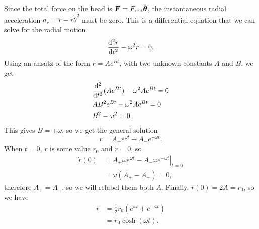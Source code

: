 \documentclass[../classical_mechanics.tex]{subfiles}
\begin{document}
\begin{example}
                Since the total force on the bead is $\boldsymbol{F}=F_\text{rod}\hat{\boldsymbol{\theta}}$, the instantaneous radial acceleration $a_r=\ddot{r}-r\dot{\theta}^2$ must be zero.
                This is a differential equation that we can solve for the radial motion.
                \begin{equation}
                    \dv[2]{r}{t}-\omega^2r=0.
                \end{equation}
                Using an ansatz of the form $r=Ae^{Bt}$, with two unknown constants $A$ and $B$, we get
                \begin{align}
                    &\dv[2]{}{t}(Ae^{Bt})-\omega^2Ae^{Bt}=0\\
                    &AB^2e^{Bt}-\omega^2Ae^{Bt}=0\\
                    &B^2-\omega^2=0.
                \end{align}
                This gives $B=\pm\omega$, so we get the general solution
                \begin{equation}
                    r=A_+e^{\omega t}+A_-e^{-\omega t}.
                \end{equation}
                When $t=0$, $r$ is some value $r_0$ and $\dot{r}=0$, so
                \begin{align}
                    \dot{r}(0)&=\left.A_+\omega e^{\omega t}-A_-\omega e^{-\omega t}\right|_{t=0}\\
                    &=\omega(A_+-A_-)=0,
                \end{align}
                therefore $A_+=A_-$, so we will relabel them both $A$.
                Finally, $r(0)=2A=r_0$, so we have
                \begin{align}
                    r&=\frac{1}{2}r_0(e^{\omega t}+e^{-\omega t})\\
                    &=r_0\cosh(\omega t).
                \end{align}
            \end{example}
\end{document}

